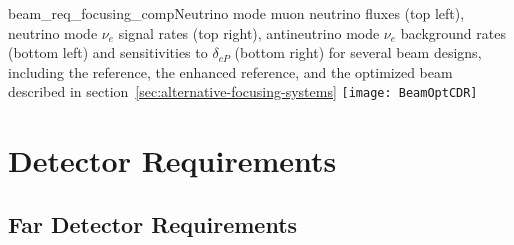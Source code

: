 \begin{cdrfigure}
{beam_req_focusing_comp}{Neutrino mode muon
    neutrino fluxes (top left), neutrino mode $\nu_e$ signal rates
    (top right), antineutrino mode $\nu_e$ background rates (bottom left) and
    sensitivities to $\delta_{cP}$ (bottom right) for several beam designs, including the
    reference, the enhanced reference, and the optimized beam described in section~\ref{sec:alternative-focusing-systems}}
  \texttt{[image: BeamOptCDR]}
\end{cdrfigure}

\section{Detector Requirements}
\label{sec:physics-lbnosc-det-req}

\subsection{Far Detector Requirements}
\label{sec:physics-lbnosc-fd-req}

